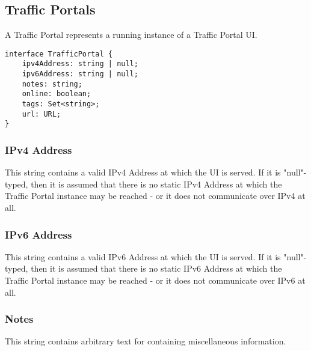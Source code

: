 %
%

\subsection{Traffic Portals}
A Traffic Portal represents a running instance of a Traffic Portal UI.

\begin{codelisting}
\begin{verbatim}
interface TrafficPortal {
	ipv4Address: string | null;
	ipv6Address: string | null;
	notes: string;
	online: boolean;
	tags: Set<string>;
	url: URL;
}
\end{verbatim}
\end{codelisting}

\subsubsection{IPv4 Address}
This string contains a valid IPv4 Address at which the UI is served. If it is
"null"-typed, then it is assumed that there is no static IPv4 Address at which
the Traffic Portal instance may be reached - or it does not communicate over
IPv4 at all.

\subsubsection{IPv6 Address}
This string contains a valid IPv6 Address at which the UI is served. If it is
"null"-typed, then it is assumed that there is no static IPv6 Address at which
the Traffic Portal instance may be reached - or it does not communicate over
IPv6 at all.

\subsubsection{Notes}
This string contains arbitrary text for containing miscellaneous information.

